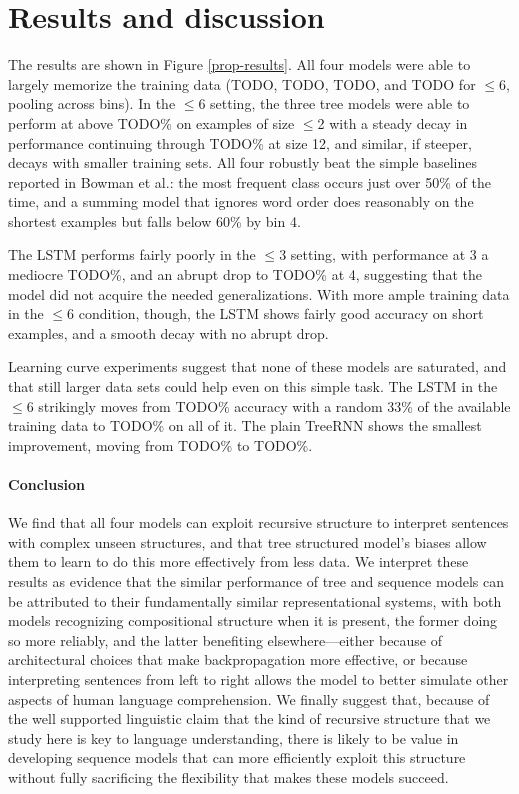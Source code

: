 \section{Results and discussion}\label{sec:discussion}

The results are shown in Figure \ref{prop-results}. All four models were able to largely memorize the training data (TODO, TODO, TODO, and TODO for $\le$6, pooling across bins). In the $\le$6 setting, the three tree models were able to perform at above TODO\% on examples of size $\le$2 with a steady decay in performance continuing through TODO\% at size 12, and similar, if steeper, decays with smaller training sets. All four robustly beat the simple baselines reported in Bowman et al.: the most frequent class occurs just over 50\% of the time, and a summing model that ignores word order does reasonably on the shortest examples but falls below 60\% by bin 4.

The LSTM performs fairly poorly in the $\le3$ setting, with performance at 3 a mediocre TODO\%, and an abrupt drop to TODO\% at 4, suggesting that the model did not acquire the needed generalizations. With more ample training data in the $\le6$ condition, though, the LSTM shows fairly good accuracy on short examples, and a smooth decay with no abrupt drop. 

Learning curve experiments suggest that none of these models are saturated, and that still larger data sets could help even on this simple task. The LSTM in the $\le6$ strikingly moves from TODO\% accuracy with a random 33\% of the available training data to TODO\% on all of it. The plain TreeRNN shows the smallest improvement, moving from TODO\% to TODO\%.

\paragraph{Conclusion}

We find that all four models can exploit recursive structure to interpret sentences with complex unseen structures, and that tree structured model's biases allow them to learn to do this more effectively from less data. 
We interpret these results as evidence that the similar performance of tree and sequence models can be attributed to their fundamentally similar representational systems, with both models recognizing compositional structure when it is present, the former doing so more reliably, and the latter benefiting elsewhere---either because of architectural choices that make backpropagation more effective, or because interpreting sentences from left to right allows the model to better simulate other aspects of human language comprehension. We finally suggest that, because of the well supported linguistic claim that the kind of recursive structure that we study here is key to language understanding, there is likely to be value in developing sequence models that can more efficiently exploit this structure without fully sacrificing the flexibility that makes these models succeed.
